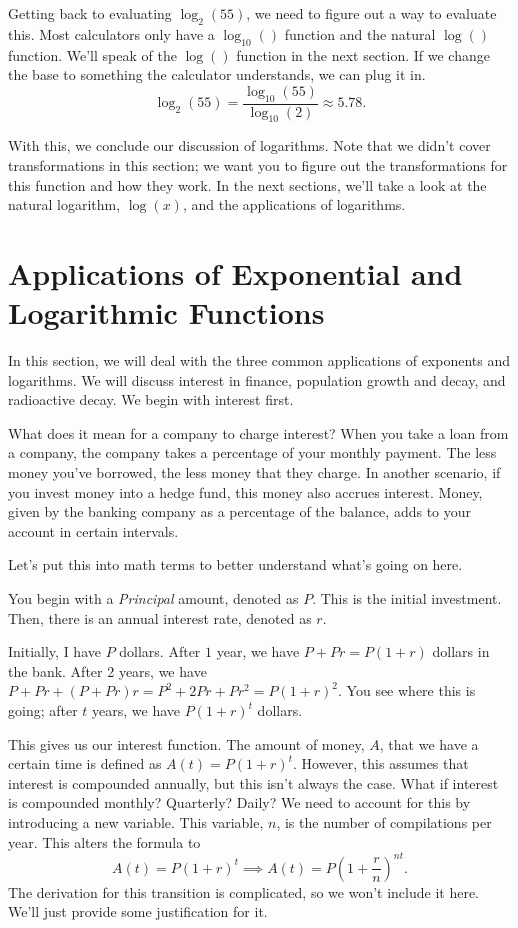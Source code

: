 \documentclass[../book.tex]{subfiles}
\begin{document}
Getting back to evaluating $\log_2(55)$, we need to figure out a way to evaluate this.  Most calculators only have a $\log_{10}()$ function and the natural $\log()$ function.  We'll speak of the $\log()$ function in the next section.  If we change the base to something the calculator understands, we can plug it in.  $$\log_2(55)=\dfrac{\log_{10}(55)}{\log_{10}(2)}\approx 5.78.$$

With this, we conclude our discussion of logarithms.  Note that we didn't cover transformations in this section; we want you to figure out the transformations for this function and how they work.  In the next sections, we'll take a look at the natural logarithm, $\log(x)$, and the applications of logarithms.  
\section{Applications of Exponential and Logarithmic Functions}
\noindent In this section, we will deal with the three common applications of exponents and logarithms.  We will discuss interest in finance, population growth and decay, and radioactive decay.  We begin with interest first.

What does it mean for a company to charge interest?  When you take a loan from a company, the company takes a percentage of your monthly payment.  The less money you've borrowed, the less money that they charge.  In another scenario, if you invest money into a hedge fund, this money also accrues interest.  Money, given by the banking company as a percentage of the balance, adds to your account in certain intervals.

Let's put this into math terms to better understand what's going on here.

You begin with a \textit{Principal} amount, denoted as $P$.  This is the initial investment.  Then, there is an annual interest rate, denoted as $r$.  

Initially, I have $P$ dollars.  After $1$ year, we have $P+Pr=P(1+r)$ dollars in the bank.  After 2 years, we have $P+Pr+(P+Pr)r=P^2+2Pr+Pr^2=P(1+r)^2.$  You see where this is going; after $t$ years, we have $P(1+r)^t$ dollars.

This gives us our interest function.  The amount of money, $A$, that we have a certain time is defined as $A(t)=P(1+r)^t$.  However, this assumes that interest is compounded annually, but this isn't always the case.  What if interest is compounded monthly? Quarterly? Daily?  We need to account for this by introducing a new variable.  This variable, $n$, is the number of compilations per year.  This alters the formula to $$A(t)=P(1+r)^t \implies A(t)=P\left(1+\dfrac{r}{n}\right)^{nt}.$$  The derivation for this transition is complicated, so we won't include it here.  We'll just provide some justification for it.
\end{document}
